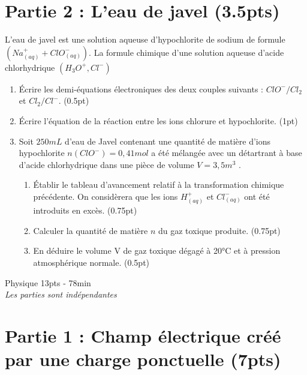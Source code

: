 \documentclass[12pt]{article}
\begin{document}
\section*{Partie 2 : L’eau de javel \dotfill(3.5pts) }

L’eau de javel est une solution aqueuse d’hypochlorite de sodium de formule $(Na^+_{(aq)} + ClO^-_{(aq)} )$.
La formule chimique d’une solution aqueuse d’acide chlorhydrique $(H_3O^+,Cl^-)$
\begin{enumerate}
  \item Écrire les demi-équations électroniques des deux couples suivants : $ClO^-/Cl_2$ et $Cl_2 /Cl^-$. \dotfill(0.5pt)
    
  \item  Écrire l’équation de la réaction entre les ions chlorure et hypochlorite. \dotfill(1pt)
  
  \item Soit $250mL$ d’eau de Javel contenant une quantité de matière d’ions hypochlorite $n(ClO^-)=0,41mol$ a été mélangée avec un détartrant à base d’acide chlorhydrique dans une pièce de volume $V=3,5 m^3$ .
    \begin{enumerate}
 \item Établir le tableau d’avancement relatif à la transformation chimique précédente. On considèrera que les ions $H^+_{(aq)}$ et $Cl^-_{(aq)}$ ont été introduits en excès. \dotfill(0.75pt)

 \item Calculer la quantité de matière $n$ du gaz toxique produite. \dotfill(0.75pt)
 \item En déduire le volume V de gaz toxique dégagé à 20°C et à pression atmosphérique normale. \dotfill(0.5pt)
   \end{enumerate}
\end{enumerate}

\begin{center}
    \vspace{2cm}
\hrulefill
\Large{Physique 13pts - 78min}
\hrulefill\\
    \emph{Les parties sont indépendantes}
\end{center}
 \section*{Partie 1 : Champ électrique créé par une charge ponctuelle \dotfill(7pts)}
\end{document}
